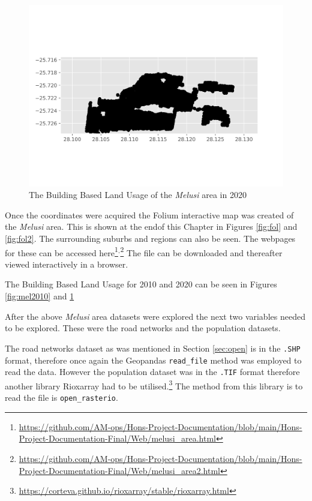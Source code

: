 \begin{figure}[H]
\centering
\includegraphics[width=1\textwidth]{Figures/Chapter3/Melusi2020}
\caption{The Building Based Land Usage of the \textit{Melusi} area in 2020}
\label{fig:mel2020}
\end{figure}
Once the coordinates were acquired the Folium interactive map was created of the \textit{Melusi} area. This is shown at the endof this Chapter in Figures \ref{fig:fol} and \ref{fig:fol2}. The surrounding suburbs and regions can also be seen. The webpages for these can be accessed here\footnote{\url{https://github.com/AM-ops/Hons-Project-Documentation/blob/main/Hons-Project-Documentation-Final/Web/melusi_area.html}}$^{,}$\footnote{\url{https://github.com/AM-ops/Hons-Project-Documentation/blob/main/Hons-Project-Documentation-Final/Web/melusi_area2.html}}
The file can be downloaded and thereafter viewed interactively in a browser.

The Building Based Land Usage for 2010 and 2020 can be seen in Figures \ref{fig:mel2010} and \ref{fig:mel2020}

After the above \textit{Melusi} area datasets were explored the next two variables needed to be explored. These were the road networks and the population datasets.

The road networks dataset as was mentioned in Section \ref{sec:open} is in the \texttt{.SHP} format, therefore once again the Geopandas \texttt{read\_file} method was employed to read the data. However the population dataset was in the \texttt{.TIF} format therefore another library Rioxarray had to be utilised.\footnote{\url{https://corteva.github.io/rioxarray/stable/rioxarray.html}} The method from this library is to read the file is \texttt{open\_rasterio}.

